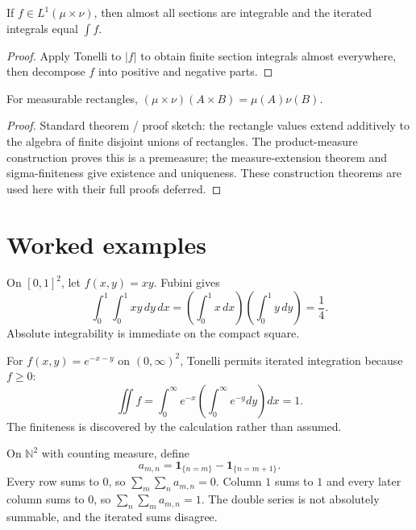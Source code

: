 \begin{theorem}\label{thm:iii05-02}
If $f\in L^1(\mu\times\nu)$, then almost all sections are integrable and the iterated integrals equal $\int f$.
\begin{proof}
Apply Tonelli to $|f|$ to obtain finite section integrals almost everywhere, then decompose $f$ into positive and negative parts.
\end{proof}
\end{theorem}

\begin{theorem}\label{thm:iii05-03}
For measurable rectangles, $(\mu\times\nu)(A\times B)=\mu(A)\nu(B)$.
\begin{proof}
Standard theorem / proof sketch: the rectangle values extend additively to the algebra of finite disjoint unions of rectangles. The product-measure construction proves this is a premeasure; the measure-extension theorem and sigma-finiteness give existence and uniqueness. These construction theorems are used here with their full proofs deferred.
\end{proof}
\end{theorem}

\section{Worked examples}

\begin{example}\label{ex:iii05-worked-01}
On \([0,1]^2\), let \(f(x,y)=xy\). Fubini gives
\[
\int_0^1\!\!\int_0^1xy\,dy\,dx
=\left(\int_0^1x\,dx\right)\left(\int_0^1y\,dy\right)=\frac14.
\]
Absolute integrability is immediate on the compact square.
\end{example}

\begin{example}\label{ex:iii05-worked-02}
For \(f(x,y)=e^{-x-y}\) on \((0,\infty)^2\), Tonelli permits iterated
integration because \(f\ge0\):
\[
\iint f=\int_0^\infty e^{-x}\left(\int_0^\infty e^{-y}dy\right)dx=1.
\]
The finiteness is discovered by the calculation rather than assumed.
\end{example}

\begin{example}\label{ex:iii05-worked-03}
On \(\mathbb N^2\) with counting measure, define
\[
a_{m,n}=\mathbf1_{\{n=m\}}-\mathbf1_{\{n=m+1\}}.
\]
Every row sums to \(0\), so \(\sum_m\sum_n a_{m,n}=0\). Column \(1\) sums to
\(1\) and every later column sums to \(0\), so
\(\sum_n\sum_m a_{m,n}=1\). The double series is not absolutely summable, and
the iterated sums disagree.
\end{example}

